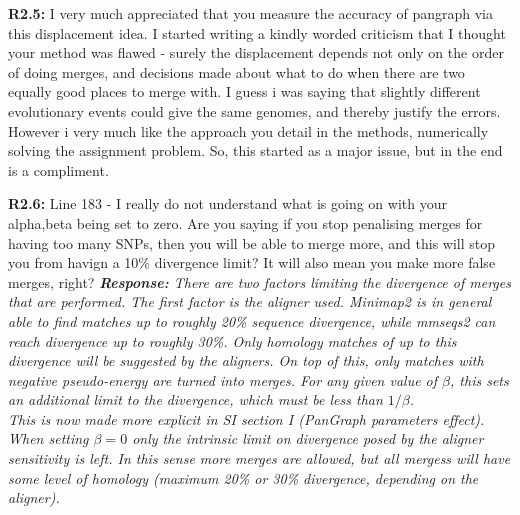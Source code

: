 \documentclass[aps,rmp,onecolumn]{revtex4-1}
\newcommand{\Marco}[1]{{\color{gray}Marco: #1}}
\newcommand{\Liam}[1]{{\color{teal}Liam: #1}}
\newcommand{\reviewer}[2]{\textbf{#1:} #2\vskip 5mm}
\newcommand{\response}[1]{{\it {\color{response}\textbf{Response:} #1}}\vskip 5mm}
\begin{document}
\reviewer{R2.5}{I very much appreciated that you measure the accuracy of pangraph via this displacement idea. I started writing a kindly worded criticism that I thought your method was flawed - surely the displacement depends not only on the order of doing merges, and decisions made about what to do when there are two equally good places to merge with. I guess i was saying that slightly different evolutionary events could give the same genomes, and thereby justify the errors. However i very much like the approach you detail in the methods, numerically solving the assignment problem. So, this started as a major issue, but in the end is a compliment.}

\reviewer{R2.6}{Line 183 - I really do not understand what is going on with your alpha,beta being set to zero. Are you saying if you stop penalising merges for having too many SNPs, then you will be able to merge more, and this will stop you from havign a 10\% divergence limit? It will also mean you make more false merges, right?}
\response{There are two factors limiting the divergence of merges that are performed. The first factor is the aligner used. Minimap2 is in general able to find matches up to roughly 20\% sequence divergence, while mmseqs2 can reach divergence up to roughly 30\%. Only homology matches of up to this divergence will be suggested by the aligners. On top of this, only matches with negative pseudo-energy are turned into merges. For any given value of $\beta$, this sets an additional limit to the divergence, which must be less than $1/\beta$.\\
      This is now made more explicit in SI section I (PanGraph parameters effect).\\
      When setting $\beta = 0$ only the intrinsic limit on divergence posed by the aligner sensitivity is left. In this sense more merges are allowed, but all mergess will have some level of homology (maximum 20\% or 30\% divergence, depending on the aligner).}
\end{document}
